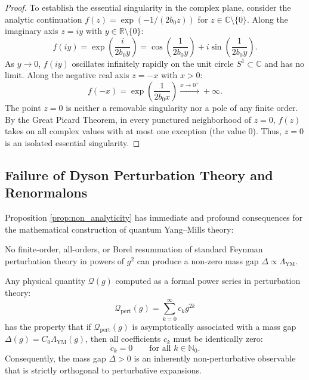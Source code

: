 \begin{proof}
To establish the essential singularity in the complex plane, consider the analytic continuation $f(z) = \exp(-1/(2b_0 z))$ for $z \in \mathbb{C} \setminus \{0\}$. Along the imaginary axis $z = i y$ with $y \in \mathbb{R} \setminus \{0\}$:
\begin{equation}
f(i y) = \exp\left( \frac{i}{2 b_0 y} \right) = \cos\left( \frac{1}{2 b_0 y} \right) + i \sin\left( \frac{1}{2 b_0 y} \right).
\end{equation}
As $y \to 0$, $f(iy)$ oscillates infinitely rapidly on the unit circle $S^1 \subset \mathbb{C}$ and has no limit. Along the negative real axis $z = -x$ with $x > 0$:
\begin{equation}
f(-x) = \exp\left( \frac{1}{2 b_0 x} \right) \xrightarrow{x \to 0^+} +\infty.
\end{equation}
The point $z = 0$ is neither a removable singularity nor a pole of any finite order. By the Great Picard Theorem, in every punctured neighborhood of $z = 0$, $f(z)$ takes on all complex values with at most one exception (the value 0). Thus, $z = 0$ is an isolated essential singularity.
\end{proof}

\subsection{Failure of Dyson Perturbation Theory and Renormalons}
\label{subsec:pert_failure_renormalons}

Proposition \ref{prop:non_analyticity} has immediate and profound consequences for the mathematical construction of quantum Yang--Mills theory:

\begin{corollary}
\label{cor:pert_failure}
No finite-order, all-orders, or Borel resummation of standard Feynman perturbation theory in powers of $g^2$ can produce a non-zero mass gap $\Delta \propto \Lambda_{\mathrm{YM}}$. 

Any physical quantity $\mathcal{Q}(g)$ computed as a formal power series in perturbation theory:
\begin{equation}
\label{eq:pert_series}
\mathcal{Q}_{\mathrm{pert}}(g) = \sum_{k=0}^\infty c_k g^{2k}
\end{equation}
has the property that if $\mathcal{Q}_{\mathrm{pert}}(g)$ is asymptotically associated with a mass gap $\Delta(g) = C_0 \Lambda_{\mathrm{YM}}(g)$, then all coefficients $c_k$ must be identically zero:
\begin{equation}
c_k = 0 \qquad \text{for all } k \in \mathbb{N}_0.
\end{equation}
Consequently, the mass gap $\Delta > 0$ is an inherently non-perturbative observable that is strictly orthogonal to perturbative expansions.
\end{corollary}

